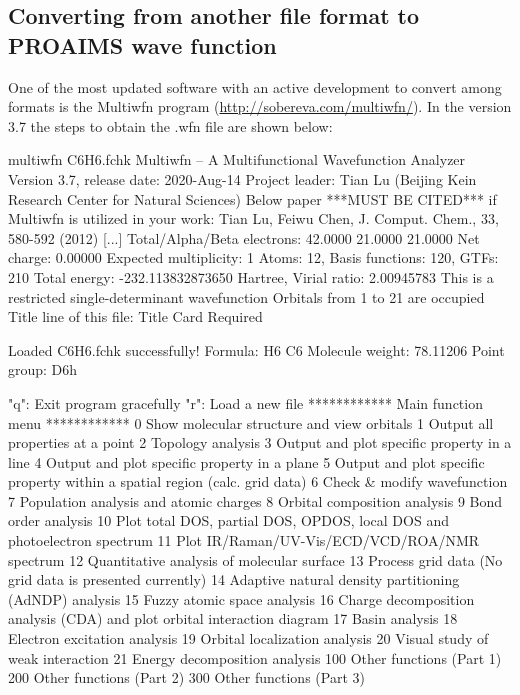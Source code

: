 \documentclass[a4paper,11pt,openany]{memoir}
\begin{document}
\begin{appendices}
\section{Converting from another file format to PROAIMS wave function}\label{appx:convertwfn}
One of the most updated software with an active development to convert among formats is the Multiwfn program (\url{http://sobereva.com/multiwfn/}). In the version 3.7 the steps to obtain the .wfn file are shown below:
\begin{consola}{multiwfn C6H6.fchk}
Multiwfn -- A Multifunctional Wavefunction Analyzer
Version 3.7, release date: 2020-Aug-14
Project leader: Tian Lu (Beijing Kein Research Center for Natural Sciences)
Below paper ***MUST BE CITED*** if Multiwfn is utilized in your work:
Tian Lu, Feiwu Chen, J. Comput. Chem., 33, 580-592 (2012)
[...]
 Total/Alpha/Beta electrons:     42.0000     21.0000     21.0000
Net charge:     0.00000      Expected multiplicity:    1
Atoms:     12,  Basis functions:    120,  GTFs:    210
Total energy:    -232.113832873650 Hartree,   Virial ratio:  2.00945783
This is a restricted single-determinant wavefunction
Orbitals from 1 to    21 are occupied
Title line of this file: Title Card Required

Loaded C6H6.fchk successfully!
Formula: H6 C6 
Molecule weight:        78.11206
Point group: D6h

"q": Exit program gracefully          "r": Load a new file
************ Main function menu ************
0 Show molecular structure and view orbitals
1 Output all properties at a point
2 Topology analysis
3 Output and plot specific property in a line
4 Output and plot specific property in a plane
5 Output and plot specific property within a spatial region (calc. grid data)
6 Check & modify wavefunction
7 Population analysis and atomic charges
8 Orbital composition analysis
9 Bond order analysis
10 Plot total DOS, partial DOS, OPDOS, local DOS and photoelectron spectrum
11 Plot IR/Raman/UV-Vis/ECD/VCD/ROA/NMR spectrum
12 Quantitative analysis of molecular surface
13 Process grid data (No grid data is presented currently)
14 Adaptive natural density partitioning (AdNDP) analysis
15 Fuzzy atomic space analysis
16 Charge decomposition analysis (CDA) and plot orbital interaction diagram
17 Basin analysis                    18 Electron excitation analysis
19 Orbital localization analysis     20 Visual study of weak interaction
21 Energy decomposition analysis
100 Other functions (Part 1)         200 Other functions (Part 2)
300 Other functions (Part 3)
\end{consola}


\end{appendices}
\end{document}
